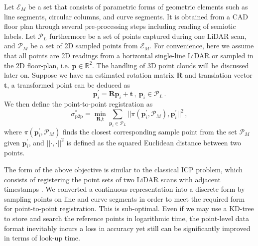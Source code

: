 \documentclass[letterpaper, 10 pt, conference]{ieeeconf}  %
\begin{document}
Let $\mathcal{E}_{M}$ be a set that consists of parametric forms of geometric elements such as line segments, circular columns, and curve segments. It is obtained from a CAD floor plan through several pre-processing steps including reading of semiotic labels. Let $\mathcal{P}_L$ furthermore be a set of points captured during one LiDAR scan, and $\mathcal{P}_M$ be a set of 2D sampled points from $\mathcal{E}_{M}$. For convenience, here we assume that all points are 2D readings from a horizontal single-line LiDAR or sampled in the 2D floor-plan, i.e. $\textbf{p} \in \mathbb{R}^2$. The handling of 3D point clouds will be discussed later on. Suppose we have an estimated rotation matrix $\textbf{R}$ and translation vector $\textbf{t}$, a transformed point can be deduced as 
%
\begin{equation}
    \label{transformed point}
    \mathbf{p}_i^{\prime} = \textbf{R}\mathbf{p}_i + \textbf{t} \,, \ 
    \mathbf{p}_i \in \mathcal{P}_L \,.
\end{equation}
We then define the point-to-point registration as
%
\begin{equation}
    \label{point-to-point registration}
    \sigma^*_{\text{p2p}} = \min_{\textbf{R}, \textbf{t}} \sum_{\mathbf{p}_i \in \mathcal{P}_L}
                            || \pi(\mathbf{p}_i^{\prime}, \mathcal{P}_M), \mathbf{p}_i^{\prime} ||^2\,,
\end{equation}
%
where $\pi(\mathbf{p}_i^{\prime}, \mathcal{P}_M)$ finds the closest corresponding sample point from the set $\mathcal{P}_M$ given $\mathbf{p}_i^{\prime}$, and $||\cdot,\cdot||^2$ is defined as the squared Euclidean distance between two points.

The form of the above objective is similar to the classical ICP problem, which consists of registering the point sets of two LiDAR scans with adjacent timestamps \cite{besl1992method}. We converted a continuous representation into a discrete form by sampling points on line and curve segments in order to meet the required form for point-to-point registration. This is sub-optimal. Even if we may use a KD-tree to store and search the reference points in logarithmic time, the point-level data format inevitably incurs a loss in accuracy yet still can be significantly improved in terms of look-up time.
\end{document}
